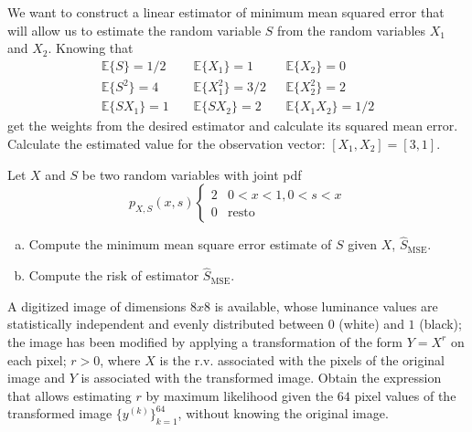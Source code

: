 \begin{prob}
We want to construct a linear estimator of minimum mean squared error that will allow us to estimate the random variable $S$ from the random variables $X_1$ and $X_2$. Knowing that
\begin{equation}
\begin{array}{lll} \mathbb{E}\{S\} = 1/2 & \mathbb{E}\{X_1\} = 1 & \mathbb{E}\{X_2\} = 0 \\ \mathbb{E}\{S^2\} = 4 & \mathbb{E}\{X_1^2\} = 3/2 & \mathbb{E}\{X_2^2\} = 2 \\ \mathbb{E}\{S X_1\} = 1 \;\;\;\;& \mathbb{E}\{S X_2\} = 2 \;\;\;\; & \mathbb{E}\{X_1 X_2\} = 1/2 \end{array}\nonumber
\end{equation}
get the weights from the desired estimator and calculate its squared mean error. Calculate the estimated value for the observation vector: $[X_1,X_2] = [3, 1]$.
\end{prob}


\begin{prob}
\label{ProbEstMSE+Sesgo}

Let $X$ and $S$ be two random variables with joint pdf
\[
p_{X,S}(x,s) \left \{ \begin{array}{ll} 2 & 0<x<1, 0<s<x\\ 0 & \mbox{resto} \end{array} \right.
\]
\begin{enumerate}[a)]
\item Compute the minimum mean square error estimate of $S$ given $X$, $\hat S_{\text{MSE}}$.
\item Compute the risk of estimator $\hat S_\text{MSE}$.
\end{enumerate}

\end{prob}


\begin{prob}
\label{ProbEstImagen}

A digitized image of dimensions $8x8$ is available, whose luminance values are statistically independent and evenly distributed between $0$ (white) and $1$ (black); the image has been modified by applying a transformation of the form $Y = X^r$ on each pixel; $r>0$, where $X$ is the r.v. associated with the pixels of the original image and $Y$ is associated with the transformed image. Obtain the expression that allows estimating $r$ by maximum likelihood given the $64$ pixel values of the transformed image $\{y^{(k)}\}_{k=1}^{64}$, without knowing the original image.

\end{prob}


